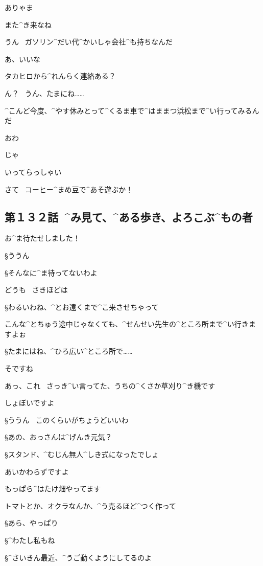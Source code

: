 \A ありゃま

\A また^{き}{来}なね

\M うん
\ ガソリン^{だい}{代}^{かいしゃ}{会社}^{も}{持}ちなんだ

\A あ、いいな

\page
\A タカヒロから^{れんらく}{連絡}ある？

\M ん？
\ うん、たまにね……

\M ^{こんど}{今度}、^{やす}{休}みとって^{くるま}{車}で^{はままつ}{浜松}まで^{い}{行}ってみるんだ

\A おわ

\page
\M じゃ

\A いってらっしゃい

\page
\A さて
\ コーヒー^{まめ}{豆}で^{あそ}{遊}ぶか！


\subsection{第１３２話\ ^{み}{見}て、^{ある}{歩}き、よろこぶ^{もの}{者}}

\page[20]
\A お^{ま}{待}たせしました！

\S ううん

\S そんなに^{ま}{待}ってないわよ

\A どうも
\ さきほどは

\S わるいわね、^{とお}{遠}くまで^{こ}{来}させちゃって

\A こんな^{とちゅう}{途中}じゃなくても、^{せんせい}{先生}の^{ところ}{所}まで^{い}{行}きますよぉ

\S たまにはね、^{ひろ}{広}い^{ところ}{所}で……

\page
\A そですね

\A あっ、これ
\ さっき^{い}{言}ってた、うちの^{くさか}{草刈}り^{き}{機}です

\A しょぼいですよ

\S ううん
\ このくらいがちょうどいいわ

\page
\S あの、おっさんは^{げんき}{元気}？

\S スタンド、^{むじん}{無人}^{しき}{式}になったでしょ

\A あいかわらずですよ

\A もっぱら^{はたけ}{畑}やってます

\A トマトとか、オクラなんか、^{う}{売}るほど^{つく}{作}って

\S あら、やっぱり

\S ^{わたし}{私}もね

\S ^{さいきん}{最近}、^{うご}{動}くようにしてるのよ

